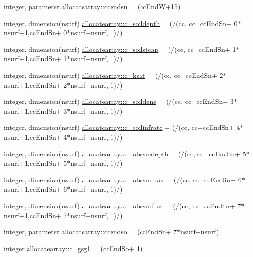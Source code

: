 \begin{DoxyCompactItemize}
\item 
integer, parameter \hyperlink{namespaceallocatearray_a397127ec5c2e34ea6ca3aa06564180b2}{allocatearray\+::ccendsn} = (cc\+EndW+15)
\item 
integer, dimension(nsurf) \hyperlink{namespaceallocatearray_a2cc3fd64e8be89aafe99172acbb85c29}{allocatearray\+::c\+\_\+soildepth} = (/(cc, cc=cc\+End\+Sn+ 0$\ast$nsurf+1,cc\+End\+Sn+ 0$\ast$nsurf+nsurf, 1)/)
\item 
integer, dimension(nsurf) \hyperlink{namespaceallocatearray_a29f130b20ba3693a1f9e7340d53a96c2}{allocatearray\+::c\+\_\+soilstcap} = (/(cc, cc=cc\+End\+Sn+ 1$\ast$nsurf+1,cc\+End\+Sn+ 1$\ast$nsurf+nsurf, 1)/)
\item 
integer, dimension(nsurf) \hyperlink{namespaceallocatearray_a47724ffebb2294115eade5c48938816b}{allocatearray\+::c\+\_\+ksat} = (/(cc, cc=cc\+End\+Sn+ 2$\ast$nsurf+1,cc\+End\+Sn+ 2$\ast$nsurf+nsurf, 1)/)
\item 
integer, dimension(nsurf) \hyperlink{namespaceallocatearray_a2a4db756af0dc3a2e28d82b831ee94bd}{allocatearray\+::c\+\_\+soildens} = (/(cc, cc=cc\+End\+Sn+ 3$\ast$nsurf+1,cc\+End\+Sn+ 3$\ast$nsurf+nsurf, 1)/)
\item 
integer, dimension(nsurf) \hyperlink{namespaceallocatearray_a3405541f33797c10f2aaa4a78c66cc80}{allocatearray\+::c\+\_\+soilinfrate} = (/(cc, cc=cc\+End\+Sn+ 4$\ast$nsurf+1,cc\+End\+Sn+ 4$\ast$nsurf+nsurf, 1)/)
\item 
integer, dimension(nsurf) \hyperlink{namespaceallocatearray_a9b49ada474982a9b6ff4af05c6541e16}{allocatearray\+::c\+\_\+obssmdepth} = (/(cc, cc=cc\+End\+Sn+ 5$\ast$nsurf+1,cc\+End\+Sn+ 5$\ast$nsurf+nsurf, 1)/)
\item 
integer, dimension(nsurf) \hyperlink{namespaceallocatearray_a4bd2ca130f4137bcec05fc943934d533}{allocatearray\+::c\+\_\+obssmmax} = (/(cc, cc=cc\+End\+Sn+ 6$\ast$nsurf+1,cc\+End\+Sn+ 6$\ast$nsurf+nsurf, 1)/)
\item 
integer, dimension(nsurf) \hyperlink{namespaceallocatearray_ad7ba2314a385ef6eacbe331dc96b909b}{allocatearray\+::c\+\_\+obssnrfrac} = (/(cc, cc=cc\+End\+Sn+ 7$\ast$nsurf+1,cc\+End\+Sn+ 7$\ast$nsurf+nsurf, 1)/)
\item 
integer, parameter \hyperlink{namespaceallocatearray_a922755b4a31be9cf5aacb0c3ce37aa10}{allocatearray\+::ccendso} = (cc\+End\+Sn+ 7$\ast$nsurf+nsurf)
\item 
integer \hyperlink{namespaceallocatearray_a10397ddbe69224c2751100ffad7d60ed}{allocatearray\+::c\+\_\+gsg1} = (cc\+End\+So+ 1)
\item 

\end{DoxyCompactItemize}
